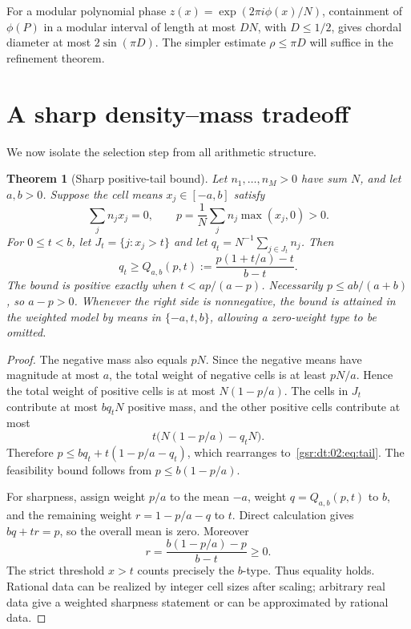 \documentclass[11pt,letterpaper]{article}
\numberwithin{equation}{section}
\newtheorem{theorem}{Theorem}[section]
\theoremstyle{definition}
\theoremstyle{remark}
\newcommand{\1}{\mathbf 1}
\newcommand{\srctag}[1]{\texorpdfstring{\enspace\textup{[#1]}}{ [#1]}}
\newcommand{\srcnote}[2]{\par\noindent{\small\textit{Source #1, delivered #2.}}\par}
\begin{document}
For a modular polynomial phase $z(x)=\exp(2\pi i\phi(x)/N)$, containment of $\phi(P)$ in a modular interval of length at most $DN$, with $D\leq1/2$, gives chordal diameter at most $2\sin(\pi D)$. The simpler estimate $\rho\leq\pi D$ will suffice in the refinement theorem.

\section[{A sharp density--mass tradeoff\srctag{02}}]{A sharp density--mass tradeoff}\label{gsr:dt:02:sec:d7}\label{gsr:dt:02:sec:tail}
\srcnote{02}{Section 7}
We now isolate the selection step from all arithmetic structure.

\begin{theorem}[Sharp positive-tail bound]\label{gsr:dt:02:thm:tail}
Let $n_1,\ldots,n_M>0$ have sum $N$, and let $a,b>0$. Suppose the cell means $x_j\in[-a,b]$ satisfy
\[
 \sum_jn_jx_j=0,\qquad
 p=\frac1N\sum_jn_j\max(x_j,0)>0.
\]
For $0\leq t<b$, let $J_t=\{j:x_j>t\}$ and let
$q_t=N^{-1}\sum_{j\in J_t}n_j$. Then
\begin{equation}\label{gsr:dt:02:eq:tail}
 \boxed{\quad q_t\geq
 Q_{a,b}(p,t):=\frac{p(1+t/a)-t}{b-t}.\quad}
\end{equation}
The bound is positive exactly when $t<ap/(a-p)$. Necessarily $p\leq ab/(a+b)$, so $a-p>0$. Whenever the right side is nonnegative, the bound is attained in the weighted model by means in $\{-a,t,b\}$, allowing a zero-weight type to be omitted.
\end{theorem}
\begin{proof}
The negative mass also equals $pN$. Since the negative means have magnitude at most $a$, the total weight of negative cells is at least $pN/a$. Hence the total weight of positive cells is at most $N(1-p/a)$. The cells in $J_t$ contribute at most $bq_tN$ positive mass, and the other positive cells contribute at most
\[
 t\bigl(N(1-p/a)-q_tN\bigr).
\]
Therefore $p\leq bq_t+t(1-p/a-q_t)$, which rearranges to~\eqref{gsr:dt:02:eq:tail}. The feasibility bound follows from $p\leq b(1-p/a)$.

For sharpness, assign weight $p/a$ to the mean $-a$, weight $q=Q_{a,b}(p,t)$ to $b$, and the remaining weight $r=1-p/a-q$ to $t$. Direct calculation gives $bq+tr=p$, so the overall mean is zero. Moreover
\[
 r=\frac{b(1-p/a)-p}{b-t}\geq0.
\]
The strict threshold $x>t$ counts precisely the $b$-type. Thus equality holds. Rational data can be realized by integer cell sizes after scaling; arbitrary real data give a weighted sharpness statement or can be approximated by rational data.
\end{proof}
\end{document}

